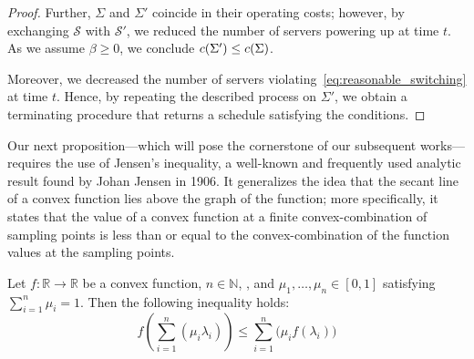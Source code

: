 \begin{proof}
Further, $\Sigma$ and $\Sigma'$ coincide in their operating costs; however, by exchanging $\mathcal{S}$ with $\mathcal{S}'$, we reduced the number of servers powering up at time $t$. As we assume $\beta\ge0$, we conclude $c(\Sigma')\le c(\Sigma)$.

Moreover, we decreased the number of servers violating~\eqref{eq:reasonable_switching} at time $t$. Hence, by repeating the described process on $\Sigma'$, we obtain a terminating procedure that returns a schedule satisfying the conditions.
\end{proof}

Our next proposition---which will pose the cornerstone of our subsequent works---requires the use of Jensen's inequality, a well-known and frequently used analytic result found by Johan Jensen in 1906. It generalizes the idea that the secant line of a convex function lies above the graph of the function; more specifically, it states that the value of a convex function at a finite convex-combination of sampling points is less than or equal to the convex-combination of the function values at the sampling points.
\begin{lem}\label{lem:jensens-inequality}
Let $f:\mathbb{R}\rightarrow\mathbb{R}$ be a convex function, $n\in\mathbb{N}$, , and $\mu_1,\dotsc,\mu_n\in[0,1]$ satisfying $\sum\limits_{i=1}^{n}\mu_i=1$. Then the following inequality holds:
\begin{equation*}
	f\left(\sum_{i=1}^n(\mu_i \lambda_i)\right) \le \sum_{i=1}^n\bigl(\mu_i f(\lambda_i)\bigr)
\end{equation*}
\end{lem}
